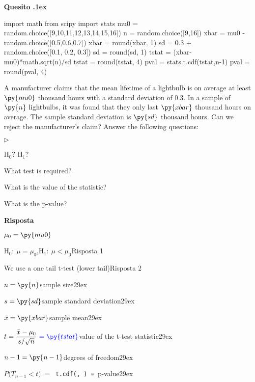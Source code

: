 \documentclass[11pt,twoside,a4paper]{article}
\newcommand{\mylabel}[1]{#1\hfill}
\renewenvironment{itemize}
  {\begin{list}{$\triangleright$}{%
   \setlength{\parskip}{0mm}
   \setlength{\topsep}{.4\baselineskip}
   \setlength{\rightmargin}{0mm}
   \setlength{\listparindent}{0mm}
   \setlength{\itemindent}{0mm}
   \setlength{\labelwidth}{2ex}
   \setlength{\itemsep}{.4\baselineskip}
   \setlength{\parsep}{0mm}
   \setlength{\partopsep}{0mm}
   \setlength{\labelsep}{1ex}
   \setlength{\leftmargin}{\labelwidth+\labelsep}
   \let\makelabel\mylabel}}{%
   \end{list}\vspace*{-1.3mm}}
\newcounter{quesito}
\newenvironment{question}{\addtocounter{quesito}{1}\par\textbf{Quesito \thequesito.\kern1ex}}{\vspace{0.5\parskip}}
\newenvironment{answer}{\par\textbf{Risposta\quad}}{\vspace{\parskip}}
\begin{document}
  
  
  \begin{question}
  \begin{pycode}
  import math
  from scipy import stats
  mu0 = random.choice([9,10,11,12,13,14,15,16])
  n = random.choice([9,16])
  xbar = mu0 - random.choice([0.5,0.6,0.7])
  xbar = round(xbar, 1)
  sd = 0.3 + random.choice([0.1, 0.2, 0.3])
  sd = round(sd, 1)
  tstat = (xbar-mu0)*math.sqrt(n)/sd
  tstat = round(tstat, 4)
  pval = stats.t.cdf(tstat,n-1)
  pval = round(pval, 4)
  \end{pycode}
    A manufacturer claims that the mean lifetime of a lightbulb is on average at least $\py{mu0}$ thousand  hours with a standard deviation of $0.3$. In a sample of $\py{n}$ lightbulbs, it was found that they only last $\py{xbar}$ thousand hours on average. The sample standard deviation is $\py{sd}$ thousand hours. Can we reject the manufacturer's claim? Answer the following questions: 
    \begin{itemize}
      \item[1.] H$_0$? H$_1$? 
      \item[2.] What test is required? 
      \item[3.] What is the value of the statistic? 
      \item[4.] What is the p-value? 
    \end{itemize} 
    
    \begin{answer}\parskip5pt
    
      $\mu_0 = \py{mu0}$
    
      {\color{blue} H$_0:\  \mu = \mu_0$,\qquad H$_1:\  \mu<\mu_0$\hfill Risposta 1}
      
     {\color{blue} We use a one tail t-test (lower tail)\hfill Risposta 2}
      
      $n = \py{n}$\hfill sample size\kern29ex
      
      $s = \py{sd}$\hfill sample standard deviation\kern29ex
      
      $\bar{x} = \py{xbar}$\hfill sample mean\kern29ex
      
      $t = \displaystyle\frac{\bar{x}-\mu_0}{s/\sqrt{n}}\  {\color{blue}= \py{tstat}}$\hfill value of the t-test statistic\kern29ex
      
      $n-1 = \py{n-1}$\hfill degrees of freedom\kern29ex
      
      $P\big(T_{n-1}<t\big)\  =\ $
      {\tt{\color{blue}t.cdf(, )} = }\hfill p-value\kern29ex
    
    \end{answer}
    \end{question}
\end{document}
